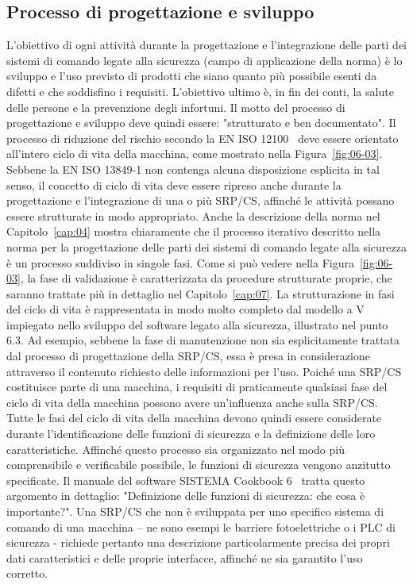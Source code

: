 \subsection{Processo di progettazione e sviluppo}
\label{subsec:06-1-1}
L'obiettivo di ogni attività durante la progettazione e l'integrazione delle parti dei sistemi di comando legate alla sicurezza (campo di applicazione della norma) è lo sviluppo e l'uso previsto di prodotti che siano quanto più possibile esenti da difetti e che soddisfino i requisiti. L'obiettivo ultimo è, in fin dei conti, la salute delle persone e la prevenzione degli infortuni. Il motto del processo di progettazione e sviluppo deve quindi essere: "strutturato e ben documentato".
Il processo di riduzione del rischio secondo la EN ISO 12100~\cite{eniso12100} deve essere orientato all'intero ciclo di vita della macchina, come mostrato nella Figura~\ref{fig:06-03}. Sebbene la EN ISO 13849-1 non contenga alcuna disposizione esplicita in tal senso, il concetto di ciclo di vita deve essere ripreso anche durante la progettazione e l'integrazione di una o più SRP/CS, affinché le attività possano essere strutturate in modo appropriato. Anche la descrizione della norma nel Capitolo~\ref{cap:04} mostra chiaramente che il processo iterativo descritto nella norma per la progettazione delle parti dei sistemi di comando legate alla sicurezza è un processo suddiviso in singole fasi. Come si può vedere nella Figura~\ref{fig:06-03}, la fase di validazione è caratterizzata da procedure strutturate proprie, che saranno trattate più in dettaglio nel Capitolo~\ref{cap:07}. La strutturazione in fasi del ciclo di vita è rappresentata in modo molto completo dal modello a V impiegato nello sviluppo del software legato alla sicurezza, illustrato nel punto 6.3. Ad esempio, sebbene la fase di manutenzione non sia esplicitamente trattata dal processo di progettazione della SRP/CS, essa è presa in considerazione attraverso il contenuto richiesto delle informazioni per l'uso.
Poiché una SRP/CS costituisce parte di una macchina, i requisiti di praticamente qualsiasi fase del ciclo di vita della macchina possono avere un'influenza anche sulla SRP/CS. Tutte le fasi del ciclo di vita della macchina devono quindi essere considerate durante l'identificazione delle funzioni di sicurezza e la definizione delle loro caratteristiche. Affinché questo processo sia organizzato nel modo più comprensibile e verificabile possibile, le funzioni di sicurezza vengono anzitutto specificate. Il manuale del software SISTEMA Cookbook 6~\cite{cookbook6} tratta questo argomento in dettaglio: "Definizione delle funzioni di sicurezza: che cosa è importante?". Una SRP/CS che non è sviluppata per uno specifico sistema di comando di una macchina – ne sono esempi le barriere fotoelettriche o i PLC di sicurezza - richiede pertanto una descrizione particolarmente precisa dei propri dati caratteristici e delle proprie interfacce, affinché ne sia garantito l'uso corretto.

